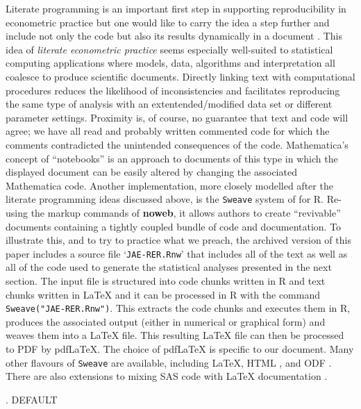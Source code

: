 \documentclass[10pt,a4paper,twoside]{article}
\let\code=\texttt
\let\pkg=\textbf
\let\proglang=\textsf
\newcommand{\file}[1]{`\code{#1}'}
\renewcommand{\section}{\secdef \mysec \mysecnn}
\newcommand{\mysec}[2][default]{\vspace{1.7\baselineskip}%
  \pdfbookmark[1]{#1}{Section.#1}%
  \refstepcounter{section}%
  \centerline{\large \thesection. \uppercase{#1}} \vspace{.5\baselineskip}}
\newcommand{\mysecnn}[1]{\vspace{1.7\baselineskip}%
  \centerline{\large #1} \vspace{.5\baselineskip}}
\begin{document}
Literate programming is an important first step in supporting reproducibility in
econometric practice but one would like to carry the idea a step further and include not only
the code but also its results dynamically in a document \citep{repro:Leisch+Rossini:2003}. 
This idea of \emph{literate econometric practice} seems especially well-suited to statistical
computing applications where models, data, algorithms and interpretation all coalesce
to produce scientific documents. Directly linking text with computational procedures
reduces the likelihood of inconsistencies and facilitates reproducing the same type of
analysis with an extentended/modified data set or different parameter
settings.  Proximity is, of course, no guarantee that text and code will agree; we have 
all read and probably written commented code for which the comments contradicted the 
unintended consequences of the code. 
\proglang{Mathematica}'s concept of ``notebooks'' is an approach to documents of this type
in which the displayed document can be easily altered by changing the associated \proglang{Mathematica}
code. Another implementation, more closely modelled after the literate programming ideas
discussed above, is the \code{Sweave} system of \cite{repro:Leisch:2002} for \proglang{R}.
Re-using the markup commands of \pkg{noweb}, it allows authors to create ``revivable'' documents
containing a tightly coupled bundle of code and documentation. To illustrate this,
and to try to practice what we preach, the archived version of this paper includes
a source file \file{JAE-RER.Rnw}
that includes all of the text as well as all of the code used to generate
the statistical analyses presented in the next section. The input file is structured
into code chunks written in \proglang{R} and text chunks written in {\LaTeX} and it
can be processed in \proglang{R} with the command \verb|Sweave("JAE-RER.Rnw")|.
This extracts the code chunks and executes them in \proglang{R}, produces the associated
output (either in numerical or graphical form) and weaves them into a 
{\LaTeX} file. This resulting {\LaTeX} file can
then be processed to PDF by pdf{\LaTeX}. The choice of pdf{\LaTeX} is specific to our document.
Many other flavours of \code{Sweave} are available, including {\LaTeX},
HTML \citep[\pkg{R2HTML},][]{repro:Lecoutre:2003}, and ODF \citep[\pkg{odfWeave},][]{repro:Kuhn:2006}.
There are also extensions to mixing \proglang{SAS} code with {\LaTeX} documentation
\citep{repro:Lenth+Hojsgaard:2007}.


\section{Replication Case Studies} \label{sec:replication}
\end{document}
